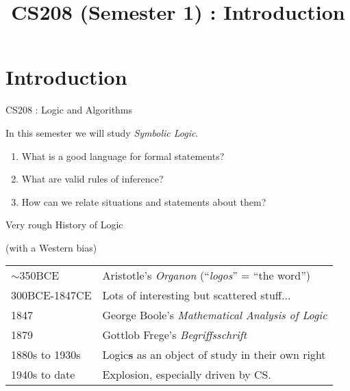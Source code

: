 \documentclass[xetex,aspectratio=169,14pt,hyperref={pdfpagelabels=true,pdflang={en-GB}}]{beamer}
\title[CS208 - Introduction]{CS208 (Semester 1) : Introduction}
\begin{document}
\maketitle

\section{Introduction}

\begin{frame}{CS208 : Logic and Algorithms}

  In this semester we will study \emph{Symbolic Logic}.

  \bigskip

  \begin{enumerate}
  \item What is a good language for formal statements?
  \item What are valid rules of inference?
  \item How can we relate situations and statements about them?
  \end{enumerate}
\end{frame}

\begin{frame}
  {Very rough History of Logic}

  (with a Western bias)

  \bigskip

  \begin{tabular}{ll}
    \textcolor{black!60}{$\sim$350BCE}& Aristotle's \emph{Organon} (``\emph{logos}'' = ``the word'') \\
    \textcolor{black!60}{300BCE-1847CE}& Lots of interesting but scattered stuff... \\
    \textcolor{black!60}{1847} & George Boole's \emph{Mathematical Analysis of Logic} \\
    \textcolor{black!60}{1879} & Gottlob Frege's \emph{Begriffsschrift} \\
    \textcolor{black!60}{1880s to 1930s} & Logic\textbf{s} as an object of study in their own right\\
    \textcolor{black!60}{1940s to date} & Explosion, especially driven by CS.
  \end{tabular}
\end{frame}
\end{document}
